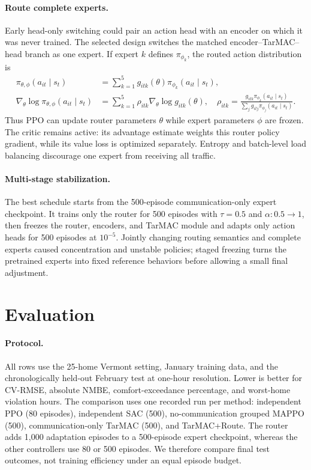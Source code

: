 \documentclass{article}
\begin{document}
\paragraph{Route complete experts.}
Early head-only switching could pair an action head with an encoder on which it
was never trained. The selected design switches the matched
encoder--TarMAC--head branch as one expert. If expert $k$ defines
$\pi_{\phi_k}$, the routed action distribution is
\begin{equation}
\begin{aligned}
\pi_{\theta,\phi}(a_{it}\mid s_t)
&=\sum_{k=1}^{5}g_{itk}(\theta)\pi_{\phi_k}(a_{it}\mid s_t),\\
\nabla_\theta\log\pi_{\theta,\phi}(a_{it}\mid s_t)
&=\sum_{k=1}^{5}\rho_{itk}\nabla_\theta\log g_{itk}(\theta),\quad
\rho_{itk}=\frac{g_{itk}\pi_{\phi_k}(a_{it}\mid s_t)}
{\sum_j g_{itj}\pi_{\phi_j}(a_{it}\mid s_t)}.
\end{aligned}
\label{eq:mixture}
\end{equation}
Thus PPO can update router parameters $\theta$ while expert parameters $\phi$
are frozen. The critic remains active: its advantage estimate weights this
router policy gradient, while its value loss is optimized separately. Entropy
and batch-level load balancing discourage one expert from receiving all traffic.


\paragraph{Multi-stage stabilization.}
The best schedule starts from the 500-episode communication-only expert
checkpoint. It
trains only the router for 500 episodes with $\tau=0.5$ and
$\alpha:0.5\!\rightarrow\!1$, then freezes the router, encoders, and TarMAC
module and adapts only action heads for 500 episodes at $10^{-5}$. Jointly
changing routing semantics and complete experts caused concentration and
unstable policies; staged freezing turns the pretrained experts into fixed
reference behaviors before allowing a small final adjustment.


\section{Evaluation}


\paragraph{Protocol.}
All rows use the 25-home Vermont setting, January training data, and the
chronologically held-out February test at one-hour resolution. Lower is better
for CV-RMSE, absolute NMBE, comfort-exceedance percentage, and worst-home
violation hours. The comparison uses one recorded run per method: independent
PPO (80 episodes), independent SAC (500), no-communication grouped MAPPO (500),
communication-only TarMAC (500), and TarMAC+Route. The router adds 1,000 adaptation episodes
to a 500-episode expert checkpoint, whereas the other controllers use 80 or
500 episodes. We therefore compare final test outcomes, not training efficiency
under an equal episode budget.
\end{document}
